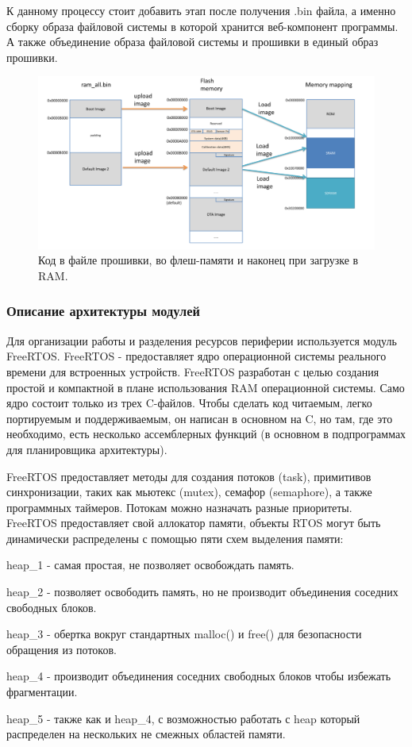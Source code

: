 К данному процессу стоит добавить этап после получения .bin файла, а именно сборку образа файловой системы в которой хранится веб-компонент программы. А также объединение образа файловой системы и прошивки в единый образ прошивки. 


\begin{figure}[h!]
    \centering
    \includegraphics[width=1.0\textwidth]{from_firmware_to_ram.png}
    \caption{Код в файле прошивки, во флеш-памяти и наконец при загрузке в RAM.}
\end{figure}


\subsubsection{ Описание архитектуры модулей}
Для организации работы и разделения ресурсов периферии используется модуль FreeRTOS. 
FreeRTOS - предоставляет ядро операционной системы реального времени для встроенных устройств. FreeRTOS разработан с целью создания простой и компактной в плане использования RAM операционной системы. Само ядро состоит только из трех C-файлов. Чтобы сделать код читаемым, легко портируемым и поддерживаемым, он написан в основном на C, но там, где это необходимо, есть несколько ассемблерных функций (в основном в подпрограммах для планировщика архитектуры).

FreeRTOS предоставляет методы для создания потоков (task), примитивов синхронизации, таких как мьютекс (mutex), семафор (semaphore), а также программных таймеров. Потокам можно назначать разные приоритеты. FreeRTOS предоставляет свой аллокатор памяти, объекты RTOS могут быть динамически распределены с помощью пяти схем выделения памяти:

\begin{my_enumerate}
\item heap\_1 - самая простая, не позволяет освобождать память.
\item heap\_2 - позволяет освободить память, но не производит объединения соседних свободных блоков.
\item heap\_3 - обертка вокруг стандартных malloc() и free() для безопасности обращения из потоков.
\item heap\_4 - производит объединения соседних свободных блоков чтобы избежать фрагментации.
\item heap\_5 - также как и heap\_4, с возможностью работать с heap который распределен на нескольких не смежных областей памяти.
\end{my_enumerate}

